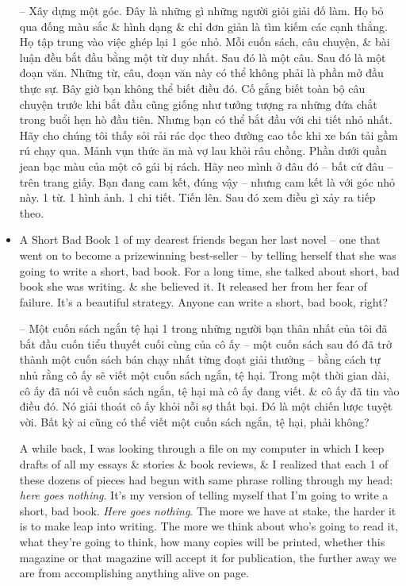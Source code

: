 \documentclass{article}
\begin{document}
\begin{itemize}
	-- Xây dựng một góc. Đây là những gì những người giỏi giải đố làm. Họ bỏ qua đống màu sắc \& hình dạng \& chỉ đơn giản là tìm kiếm các cạnh thẳng. Họ tập trung vào việc ghép lại 1 góc nhỏ. Mỗi cuốn sách, câu chuyện, \& bài luận đều bắt đầu bằng một từ duy nhất. Sau đó là một câu. Sau đó là một đoạn văn. Những từ, câu, đoạn văn này có thể không phải là phần mở đầu thực sự. Bây giờ bạn không thể biết điều đó. Cố gắng biết toàn bộ câu chuyện trước khi bắt đầu cũng giống như tưởng tượng ra những đứa chắt trong buổi hẹn hò đầu tiên. Nhưng bạn có thể bắt đầu với chi tiết nhỏ nhất. Hãy cho chúng tôi thấy sỏi rải rác dọc theo đường cao tốc khi xe bán tải gầm rú chạy qua. Mảnh vụn thức ăn mà vợ lau khỏi râu chồng. Phần dưới quần jean bạc màu của một cô gái bị rách. Hãy neo mình ở đâu đó -- bất cứ đâu -- trên trang giấy. Bạn đang cam kết, đúng vậy -- nhưng cam kết là với góc nhỏ này. 1 từ. 1 hình ảnh. 1 chi tiết. Tiến lên. Sau đó xem điều gì xảy ra tiếp theo.
	\item {\sf A Short Bad Book} 1 of my dearest friends began her last novel -- one that went on to become a prizewinning best-seller -- by telling herself that she was going to write a short, bad book. For a long time, she talked about short, bad book she was writing. \& she believed it. It released her from her fear of failure. It's a beautiful strategy. Anyone can write a short, bad book, right?
	
	-- {\sf Một cuốn sách ngắn tệ hại} 1 trong những người bạn thân nhất của tôi đã bắt đầu cuốn tiểu thuyết cuối cùng của cô ấy -- một cuốn sách sau đó đã trở thành một cuốn sách bán chạy nhất từng đoạt giải thưởng -- bằng cách tự nhủ rằng cô ấy sẽ viết một cuốn sách ngắn, tệ hại. Trong một thời gian dài, cô ấy đã nói về cuốn sách ngắn, tệ hại mà cô ấy đang viết. \& cô ấy đã tin vào điều đó. Nó giải thoát cô ấy khỏi nỗi sợ thất bại. Đó là một chiến lược tuyệt vời. Bất kỳ ai cũng có thể viết một cuốn sách ngắn, tệ hại, phải không?
	
	A while back, I was looking through a file on my computer in which I keep drafts of all my essays \& stories \& book reviews, \& I realized that each 1 of these dozens of pieces had begun with same phrase rolling through my head: {\it here goes nothing}. It's my version of telling myself that I'm going to write a short, bad book. {\it Here goes nothing}. The more we have at stake, the harder it is to make leap into writing. The more we think about who's going to read it, what they're going to think, how many copies will be printed, whether this magazine or that magazine will accept it for publication, the further away we are from accomplishing anything alive on page.
	

\end{itemize}
\end{document}
